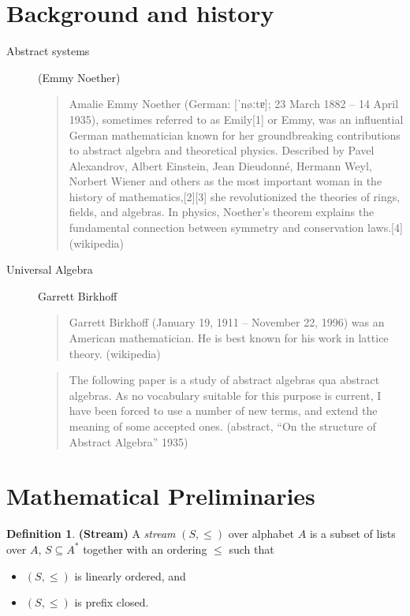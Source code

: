 \documentclass{amsart}
\theoremstyle{definition}
\newtheorem{definition}[thm]{Definition}
\begin{document}
\section{Background and history}
\begin{description}
\item[Abstract systems] (Emmy Noether)

\begin{quote}
Amalie Emmy Noether (German: [ˈnøːtɐ]; 23 March 1882 – 14 April 1935), sometimes referred to as Emily[1] or Emmy, was an influential German mathematician known for her groundbreaking contributions to abstract algebra and theoretical physics. Described by Pavel Alexandrov, Albert Einstein, Jean Dieudonné, Hermann Weyl, Norbert Wiener and others as the most important woman in the history of mathematics,[2][3] she revolutionized the theories of rings, fields, and algebras. In physics, Noether's theorem explains the fundamental connection between symmetry and conservation laws.[4] (wikipedia)\end{quote}

\item[Universal Algebra] Garrett Birkhoff
\begin{quote}
Garrett Birkhoff (January 19, 1911 – November 22, 1996) was an American mathematician. He is best known for his work in lattice theory. (wikipedia)
\end{quote}

\begin{quote}The following paper is a study of abstract algebras qua abstract algebras. As no vocabulary suitable for this purpose is current, I have been forced to use a number of new terms, and extend the meaning of some accepted ones. (abstract, ``On the structure of Abstract Algebra'' 1935)
\end{quote}
\end{description}

\section{Mathematical Preliminaries}

\begin{definition}\textbf{(Stream)} A \textit{stream} $(S, \leq)$ over alphabet $A$ is a subset of lists over $A$, $S \subseteq A^\ast$ together with an ordering $\leq$ such that
\begin{itemize}
\item $(S, \leq)$ is linearly ordered, and
\item $(S, \leq)$ is prefix closed.
\end{itemize}
\end{definition}
\end{document}
